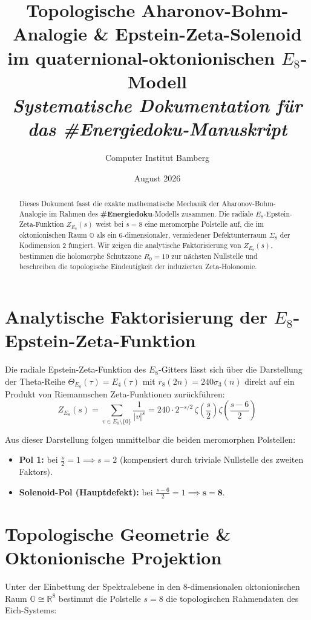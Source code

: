 \documentclass[11pt,a4paper]{article}
\title{\textbf{\color{brandblue} Topologische Aharonov-Bohm-Analogie \& Epstein-Zeta-Solenoid im quaternional-oktonionischen $E_8$-Modell}\\[0.5em]
\large \textit{Systematische Dokumentation für das \#Energiedoku-Manuskript}}
\author{Computer Institut Bamberg}
\date{August 2026}
\begin{document}
\maketitle

\begin{abstract}
Dieses Dokument fasst die exakte mathematische Mechanik der Aharonov-Bohm-Analogie im Rahmen des \textbf{\#Energiedoku}-Modells zusammen. Die radiale $E_8$-Epstein-Zeta-Funktion $Z_{E_8}(s)$ weist bei $s=8$ eine meromorphe Polstelle auf, die im oktonionischen Raum $\mathbb{O}$ als ein 6-dimensionaler, vermiedener Defektunterraum $\Sigma_8$ der Kodimension 2 fungiert. Wir zeigen die analytische Faktorisierung von $Z_{E_8}(s)$, bestimmen die holomorphe Schutzzone $R_0 = 10$ zur nächsten Nullstelle und beschreiben die topologische Eindeutigkeit der induzierten Zeta-Holonomie.
\end{abstract}

\section{Analytische Faktorisierung der $E_8$-Epstein-Zeta-Funktion}

Die radiale Epstein-Zeta-Funktion des $E_8$-Gitters lässt sich über die Darstellung der Theta-Reihe $\Theta_{E_8}(\tau) = E_4(\tau)$ mit $r_8(2n) = 240 \sigma_3(n)$ direkt auf ein Produkt von Riemannschen Zeta-Funktionen zurückführen:
\begin{equation}
Z_{E_8}(s) = \sum_{v \in E_8 \setminus \{0\}} \frac{1}{|v|^s} = 240 \cdot 2^{-s/2} \, \zeta\left(\frac{s}{2}\right) \zeta\left(\frac{s-6}{2}\right)
\end{equation}

Aus dieser Darstellung folgen unmittelbar die beiden meromorphen Polstellen:
\begin{itemize}
    \item \textbf{Pol 1:} bei $\frac{s}{2} = 1 \implies s = 2$ (kompensiert durch triviale Nullstelle des zweiten Faktors).
    \item \textbf{Solenoid-Pol (Hauptdefekt):} bei $\frac{s-6}{2} = 1 \implies \mathbf{s = 8}$.
\end{itemize}

\section{Topologische Geometrie \& Oktonionische Projektion}

Unter der Einbettung der Spektralebene in den 8-dimensionalen oktonionischen Raum $\mathbb{O} \cong \mathbb{R}^8$ bestimmt die Polstelle $s=8$ die topologischen Rahmendaten des Eich-Systems:
\end{document}
